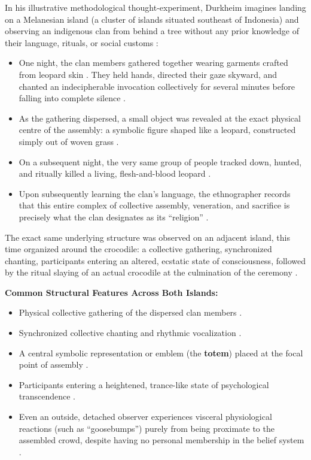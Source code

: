 In his illustrative methodological thought-experiment, Durkheim imagines landing on a Melanesian island (a cluster of islands situated southeast of Indonesia) and observing an indigenous clan from behind a tree without any prior knowledge of their language, rituals, or social customs :
\begin{itemize}
    \item One night, the clan members gathered together wearing garments crafted from leopard skin . They held hands, directed their gaze skyward, and chanted an indecipherable invocation collectively for several minutes before falling into complete silence .
    \item As the gathering dispersed, a small object was revealed at the exact physical centre of the assembly: a symbolic figure shaped like a leopard, constructed simply out of woven grass .
    \item On a subsequent night, the very same group of people tracked down, hunted, and ritually killed a living, flesh-and-blood leopard .
    \item Upon subsequently learning the clan's language, the ethnographer records that this entire complex of collective assembly, veneration, and sacrifice is precisely what the clan designates as its ``religion'' .
\end{itemize}

The exact same underlying structure was observed on an adjacent island, this time organized around the crocodile: a collective gathering, synchronized chanting, participants entering an altered, ecstatic state of consciousness, followed by the ritual slaying of an actual crocodile at the culmination of the ceremony .

\begin{ExampleBox}
\textbf{Common Structural Features Across Both Islands:}
\begin{itemize}
    \item Physical collective gathering of the dispersed clan members .
    \item Synchronized collective chanting and rhythmic vocalization .
    \item A central symbolic representation or emblem (the \textbf{totem}) placed at the focal point of assembly .
    \item Participants entering a heightened, trance-like state of psychological transcendence .
    \item Even an outside, detached observer experiences visceral physiological reactions (such as ``goosebumps'') purely from being proximate to the assembled crowd, despite having no personal membership in the belief system .
\end{itemize}
\end{ExampleBox}

